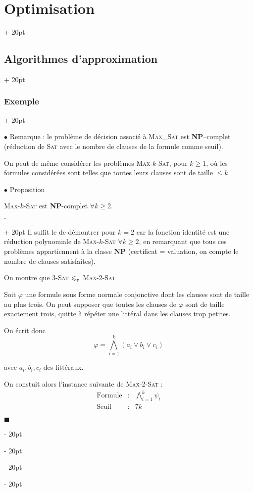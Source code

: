 \documentclass[a4paper, 12pt, twoside]{article}
\renewcommand{\le}{\leqslant}
\renewcommand{\ge}{\geqslant}
\newcommand{\ind}[1][20pt]{\advance\leftskip + #1}
\newcommand{\deind}[1][20pt]{\advance\leftskip - #1}
\newenvironment{indt}[2][20pt]{#2 \par \ind[#1]}{\par \deind} %
\newenvironment{proof}[1][{}]{\begin{indt}{$\square$ #1}}{$\blacksquare$ \end{indt}}
\newcommand{\1}{\mathbbm 1}
\begin{document}
\begin{indt}{\section{Optimisation}}
\begin{indt}{\subsection{Algorithmes d'approximation}}
\begin{indt}{\subsubsection{Exemple}}
                \vspace{12pt}
                
                $\bullet$ Remarque : le problème de décision associé à \textsc{Max\_Sat} est \textbf{NP}--complet (réduction de \textsc{Sat} avec le nombre de clauses de la formule comme seuil).

                On peut de même considérer les problèmes \textsc{Max-$k$-Sat}, pour $k \ge 1$, où les formules considérées sont telles que toutes leurs clauses sont de taille $\le k$.

                \vspace{12pt}
                
                $\bullet$ Proposition
                \begin{emphBox}
                    \textsc{Max-$k$-Sat} est \textbf{NP}-complet $\forall k \ge 2$.
                \end{emphBox}

                \vspace{6pt}
                
                \begin{proof}
                    Il suffit le de démontrer pour $k = 2$ car la fonction identité est une réduction polynomiale de \textsc{Max-$k$-Sat} $\forall k \ge 2$, en remarquant que tous ces problèmes appartiennent à la classe \textbf{NP} (certificat = valuation, on compte le nombre de clauses satisfaites).

                    On montre que $3$-\textsc{Sat} $\le_{\rm p}$ \textsc{Max-$2$-Sat}

                    Soit $\varphi$ une formule sous forme normale conjonctive dont les clauses sont de taille au plus trois.
                    On peut supposer que toutes les clauses de $\varphi$ sont de taille exactement trois, quitte à répéter une littéral dans les clauses trop petites.

                    On écrit donc
                    \[
                        \varphi = \bigwedge_{i = 1}^k (a_i \vee b_i \vee c_i)
                    \]

                    avec $a_i, b_i, c_i$ des littéraux.

                    On constuit alors l'instance suivante de \textsc{Max-2-Sat} :
                    \[
                        \begin{array}{rcl}
                            \text{Formule}
                            & :
                            & \displaystyle
                            \bigwedge_{i = 1}^k \psi_i
                            \\
                            \text{Seuil}
                            & :
                            & 7k
                        \end{array}
                    \]


\end{proof}
\end{indt}
\end{indt}
\end{indt}
\end{document}
